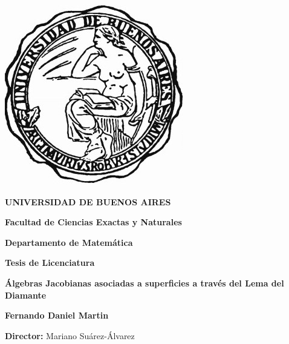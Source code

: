 
\thispagestyle{empty}

\begin {center}

\includegraphics[scale=.3]{uba2.jpg}

\medskip
\textbf{UNIVERSIDAD DE BUENOS AIRES}

\smallskip

\textbf{Facultad de Ciencias Exactas y Naturales}

\smallskip

\textbf{Departamento de Matem\'atica}

\vspace{3.5cm}

\textbf{\large Tesis de Licenciatura}


\vspace{1.5cm}

\textbf{\LARGE Álgebras Jacobianas asociadas a superficies a través del Lema del Diamante}

\vspace{1.5cm}


\textbf{\large Fernando Daniel Martin}

\end {center}


\vspace{1.5cm}

\noindent \textbf{Director:} Mariano Su\'arez-\'Alvarez


\vspace{3cm}

